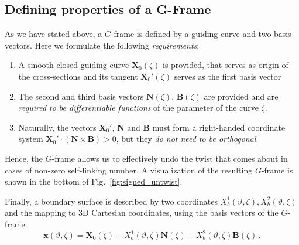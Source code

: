 \documentclass[12pt]{iopart}
\newcommand\hladdedrev[1]{#1} %
\newcommand\hlchangedrev[1]{#1} %
\newcommand\X{{\bm{X}}_0}
\newcommand\Xp{\X'}
\newcommand\Nnew{{\bm N}}
\newcommand\Bnew{{\bm B}}
\newcommand\GFF{$G$-frame}
\newcommand{\thet}{\vartheta}
\newcommand\linknum[1]{\hlchangedrev{self-linking number{#1}}}
\begin{document}
\subsection{\hladdedrev{Defining properties of a G-Frame}\label{sec:gff_def}}
%
\hladdedrev{As we have stated above, a \GFF{} is defined by a guiding curve and two basis vectors.} 
\hlchangedrev{Here we formulate the following \emph{requirements}:}
\hlchangedrev{\begin{enumerate}
   \item A smooth closed guiding curve $\X(\zeta)$ is provided, that serves as origin of the cross-sections and its tangent $\Xp(\zeta)$ serves as the first basis vector
   \item The second and third basis vectors $\Nnew(\zeta)$, $\Bnew(\zeta)$ are provided and are \emph{required to be differentiable functions} of the parameter of the curve $\zeta$.
   \item Naturally, the vectors $\Xp$, $\Nnew$ and $\Bnew$ must form a right-handed coordinate system $\Xp \cdot(\Nnew \times \Bnew)>0$, but they \emph{do not need to be orthogonal}.
\end{enumerate}}
Hence, the \GFF{} allows us to effectively undo the twist that comes about in cases of non-zero \linknum{}. A visualization of the resulting \GFF{} is shown in the bottom of Fig.~\ref{fig:signed_untwist}. 

\hladdedrev{Finally, a boundary surface is described by two coordinates $X_b^1(\thet,\zeta),X_b^2(\thet,\zeta)$ and the mapping to 3D Cartesian coordinates, using the basis vectors of the \GFF{}:
\begin{equation} 
\bm x(\thet,\zeta)=\X(\zeta)+X_b^1(\thet,\zeta)\Nnew(\zeta)+X_b^2(\thet,\zeta)\Bnew(\zeta) \,. \label{eq:gff_xyz_surf}
\end{equation}}
\end{document}

